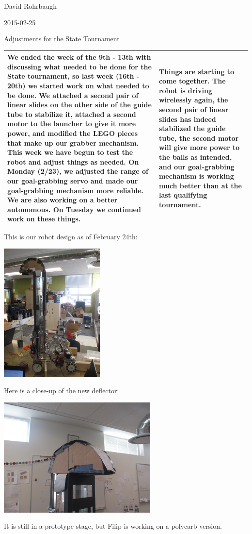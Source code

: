 David Rohrbaugh

2015-02-25

Adjustments for the State Tournament

\begin{tabular}{|p{5cm}|p{5cm}|}
 \hline
 We ended the week of the 9th - 13th with discussing what needed to be done for the State tournament, so last week (16th - 20th) we started work on what needed to be done. We attached a second pair of linear slides on the other side of the guide tube to stabilize it, attached a second motor to the launcher to give it more power, and modified the LEGO pieces that make up our grabber mechanism. This week we have begun to test the robot and adjust things as needed. On Monday (2/23), we adjusted the range of our goal-grabbing servo and made our goal-grabbing mechanism more reliable. We are also working on a better autonomous. On Tuesday we continued work on these things.
 &
 Things are starting to come together. The robot is driving wirelessly again, the second pair of linear slides has indeed stabilized the guide tube, the second motor will give more power to the balls as intended, and our goal-grabbing mechanism is working much better than at the last qualifying tournament.
 \\
 \hline
\end{tabular}

\pagebreak

This is our robot design as of February 24th:

\begin{center}
 \includegraphics[height=7cm,angle=90]{./Entries/Images/robotFeb24.JPG}
\end{center}

Here is a close-up of the new deflector:

\begin{center}
 \includegraphics[height=6cm]{./Entries/Images/newDeflectorPrototype.JPG}
\end{center}

It is still in a prototype stage, but Filip is working on a polycarb version.
